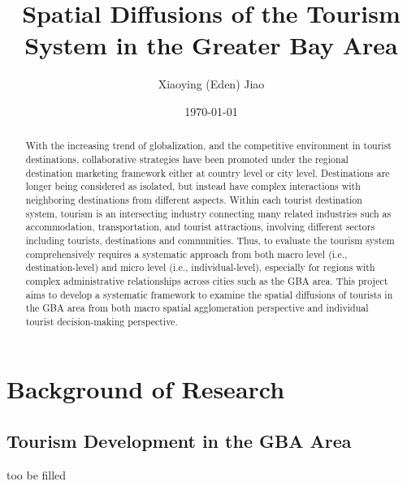 \documentclass[11pt,a4paper]{amsart}
\theoremstyle{plain}
\theoremstyle{definition}
\begin{document}
\title{S\lowercase{patial} D\lowercase{iffusions of the} T\lowercase{ourism} S\lowercase{ystem in the} G\lowercase{reater} B\lowercase{ay} A\lowercase{rea}}
\author{ X\lowercase{iaoying} (E\lowercase{den}) J\lowercase{iao}}
\date{\today}
		
\begin{abstract}
	With the increasing trend of globalization, and the competitive environment in tourist destinations, collaborative strategies have been promoted under the regional destination marketing framework either at country level or city level. Destinations are longer being considered as isolated, but instead have complex interactions with neighboring destinations from different aspects. Within each tourist destination system, tourism is an intersecting industry connecting many related industries such as accommodation, transportation, and tourist attractions, involving different sectors including tourists, destinations and communities. Thus, to evaluate the tourism system comprehensively requires a systematic approach from both macro level (i.e., destination-level) and micro level (i.e., individual-level), especially for regions with complex administrative relationships across cities such as the GBA area. This project aims to develop a systematic framework to examine the spatial diffusions of tourists in the GBA area from both macro spatial agglomeration perspective and individual tourist decision-making perspective.
\end{abstract}
		
\maketitle

\tableofcontents
\newpage

\section{Background of Research}
\subsection{Tourism Development in the GBA Area}\hfill\par
too be filled
\end{document}

